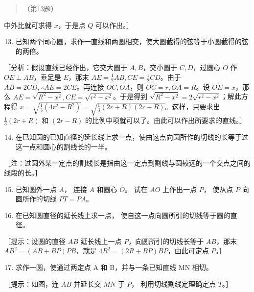 \begin{quote}
（第13题）
\end{quote}

中外比就可求得 \(x\)，于是点 \(Q\) 可以作出。］

\begin{enumerate}
\setcounter{enumi}{12}
\item
  已知两个同心圆，求作一直线和两圆相交，使大圆截得的弦等于小圆截得的弦的两倍。
\end{enumerate}

［分析：假设直线已经作出，它交大圆于 \(A, B\)，交小圆于 \(C, D\)，过圆心
\(O\) 作 \(OE \perp AB\)，垂足是 \(E\)，那末
\(AE = \frac{1}{2} AB, CE = \frac{1}{2} CD\)。由于
\(AB = 2CD, \therefore AE = 2CE\)。再连接 \(OC, OA\)，则
\(OC = r, OA = R\)。设 \(OE = x\)，那么
\(AE = \sqrt{R^2 - x^2}, CE = \sqrt{r^2 - x^2}\)。于是得到
\(\sqrt{R^2 - x^2} = 2\sqrt{r^2 - x^2}\)；解此方程得
\(x = \sqrt{\frac{1}{3}(4r^2 - R^2)} = \sqrt{\frac{1}{3}(2r + R)(2r - R)}\)。这样，只要求出
\(\frac{1}{3}(2r + R)\) 和 \((2r - R)\)
的比例中项就可以了。由此可以作出所要求的直线。］

\begin{enumerate}
\setcounter{enumi}{13}
\item
  在已知圆的已知直径的延长线上求一点，使由这点向圆所作的切线的长等于过这一点和圆心的割线长的一半。
\end{enumerate}

［注：过圆外某一定点的割线长是指由这一定点到割线与圆较远的一个交点之间的线段的长。］

\begin{enumerate}
\setcounter{enumi}{14}
\item
  已知圆外一点 \(A\)， 连接 \(A\) 和圆心 \(O\)。 试在 \(AO\) 上作出一点
  \(P\)， 使从点 \(P\) 向圆所作的切线 \(PT = PA\)。
\item
  在已知圆直径的延长线上求一点， 使自这一点向圆所引的切线等于圆的直径。
\end{enumerate}

［提示：设圆的直径 \(AB\) 延长线上一点 \(P\)，向圆所引的切线长等于
\(AB\)，那末 \(AB^{2} = (AB + BP)PB\)，就是
\(4R^{2} = (2R + BP)BP\)，由此可定点 \(P\)。］

\begin{enumerate}
\setcounter{enumi}{16}
\item
  求作一圆，使通过两定点 A 和 B，并与一条已知直线 MN 相切。
\end{enumerate}

［提示：如图，连 \(AB\) 并延长交 \(MN\) 于 \(P\)，
利用切线割线定理确定点 \(T\)。］

